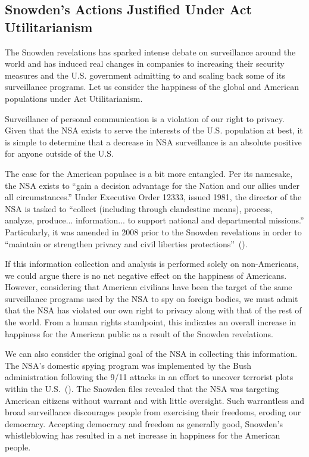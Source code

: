 \documentclass[12pt,letterpaper]{article}
\renewcommand{\citep}[1]{(\cite{#1})}
\begin{document}
\subsection*{Snowden's Actions Justified Under Act Utilitarianism}

The Snowden revelations has sparked intense debate on surveillance around the
world and has induced real changes in companies to increasing their security
measures and the U.S. government admitting to and scaling back some of its
surveillance programs. Let us consider the happiness of the global and American
populations under Act Utilitarianism.

Surveillance of personal communication is a violation of our right to privacy.
Given that the NSA exists to serve the interests of the U.S. population at
best, it is simple to determine that a decrease in NSA surveillance is an
absolute positive for anyone outside of the U.S.

The case for the American populace is a bit more entangled. Per its namesake,
the NSA exists to ``gain a decision advantage for the Nation and our allies
under all circumstances.'' Under Executive Order 12333, issued 1981, the
director of the NSA is tasked to ``collect (including through clandestine
means), process, analyze, produce... information... to support national and
departmental missions.'' Particularly, it was amended in 2008 prior to the
Snowden revelations in order to ``maintain or strengthen privacy and civil
liberties protections''~\citep{nsa2015}.

If this information collection and analysis is performed solely on
non-Americans, we could argue there is no net negative effect on the happiness
of Americans. However, considering that American civilians have been the target
of the same surveillance programs used by the NSA to spy on foreign bodies, we
must admit that the NSA has violated our own right to privacy along with that
of the rest of the world. From a human rights standpoint, this indicates an
overall increase in happiness for the American public as a result of the
Snowden revelations.

We can also consider the original goal of the NSA in collecting this
information. The NSA's domestic spying program was implemented by the Bush
administration following the 9/11 attacks in an effort to uncover terrorist
plots within the U.S.~\citep{eff2015}. The Snowden files revealed that the NSA
was targeting American citizens without warrant and with little oversight. Such
warrantless and broad surveillance discourages people from exercising their
freedoms, eroding our democracy. Accepting democracy and freedom as generally
good, Snowden's whistleblowing has resulted in a net increase in happiness for
the American people.
\end{document}

